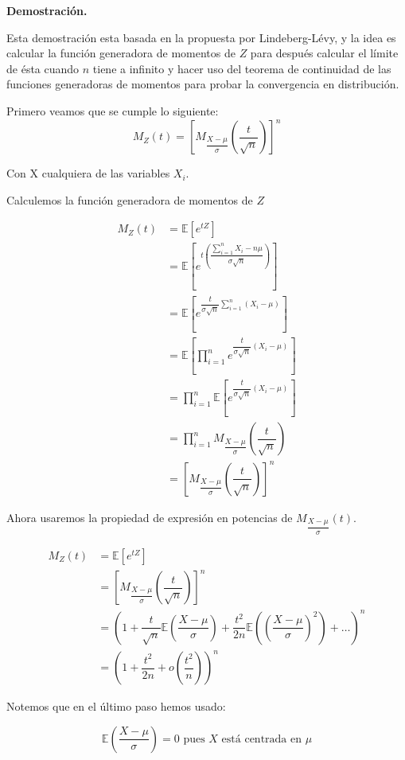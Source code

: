 \documentclass[
 12pt,
 letterpaper,
]{article}
\theoremstyle{teoremaBreak}
\theoremstyle{plain}
\theoremstyle{definition}
\begin{document}
\textbf{Demostración.}

Esta demostración esta basada en la propuesta por Lindeberg-Lévy, y la idea es calcular la función generadora 
de momentos de $Z$ para después calcular el límite de ésta cuando $n$ tiene a infinito y hacer uso del teorema 
de continuidad de las funciones generadoras de momentos para probar la convergencia en distribución.

Primero veamos que se cumple lo siguiente:
$$M_Z(t) = \left[M_{\dfrac{X - \mu}{\sigma}}(\dfrac{t}{\sqrt{n}})\right]^n$$

Con X cualquiera de las variables $X_i$.

Calculemos la función generadora de momentos de $Z$

\begin{align*}
M_Z(t) &= \mathbb{E}[e^{tZ}] \\
&= \mathbb{E}\left[e^{t\left(\dfrac{\sum_{i=1}^n X_i - n\mu}{\sigma \sqrt{n}}\right)}\right] \\
&= \mathbb{E}\left[e^{\dfrac{t}{\sigma \sqrt{n}}\sum_{i=1}^n (X_i - \mu)}\right] \\
&= \mathbb{E}\left[\prod_{i=1}^n e^{\dfrac{t}{\sigma \sqrt{n}}(X_i - \mu)}\right] \\
&= \prod_{i=1}^n \mathbb{E}\left[e^{\dfrac{t}{\sigma \sqrt{n}}(X_i - \mu)}\right] \\
&= \prod_{i=1}^n M_{\dfrac{X - \mu}{\sigma}}\left(\dfrac{t}{\sqrt{n}}\right) \\
&= \left[M_{\dfrac{X - \mu}{\sigma}}\left(\dfrac{t}{\sqrt{n}}\right)\right]^n
\end{align*}

Ahora usaremos la propiedad de expresión en potencias de $M_{\dfrac{X - \mu}{\sigma}}(t)$.

\begin{align*}
M_Z(t) &= \mathbb{E}[e^{tZ}] \\
&= \left[M_{\dfrac{X - \mu}{\sigma}}\left(\dfrac{t}{\sqrt{n}}\right)\right]^n \\
&= (1 + \dfrac{t}{\sqrt{n}} \mathbb{E}(\dfrac{X - \mu}{\sigma}) + \dfrac{t^2}{2n} \mathbb{E}((\dfrac{X - \mu}{\sigma})^2) + \ldots)^n \\
&= (1 + \dfrac{t^2}{2n} + o(\dfrac{t^2}{n}))^n
\end{align*}

Notemos que en el último paso hemos usado:

$$\mathbb{E}\left(\dfrac{X - \mu}{\sigma}\right) = 0 \text{ pues } X \text{ está centrada en } \mu$$
\end{document}
